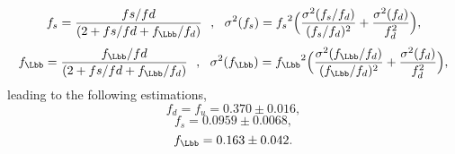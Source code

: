 \begin{equation}
f_s = \frac{fs/fd}{(2+{fs/fd}+{f_{\Lbb}/f_d})}~~,~~\sigma^2(f_s) = {f_s}^2\Big(\frac{\sigma^2(f_s/f_d)}{(f_s/f_d)^2}+\frac{\sigma^2(f_d)}{f_d^2}\Big),%
\end{equation}
\begin{equation}
f_{\Lbb} = \frac{f_{\Lbb}/fd}{(2+{fs/fd}+{f_{\Lbb}/f_d})}~~,~~\sigma^2(f_{\Lbb}) = {f_{\Lbb}}^2\Big(\frac{\sigma^2(f_{\Lbb}/f_d)}{(f_{\Lbb}/f_d)^2}+\frac{\sigma^2(f_d)}{f_d^2}\Big),%
\end{equation}
leading to the following estimations,
\begin{equation}\label{eq:fq1}
f_d = f_u = 0.370 \pm 0.016,
\end{equation}
\begin{equation}\label{eq:fq2}
f_s = 0.0959 \pm 0.0068,
\end{equation}
\begin{equation}\label{eq:fq3}
f_{\Lbb} = 0.163 \pm 0.042.
\end{equation}
